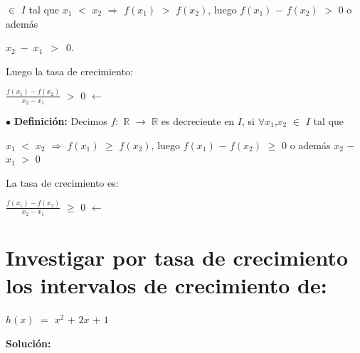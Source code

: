\documentclass[12pt]{article}
\begin{document}
$\in$ $I$ tal que $x_{1}$ $<$ $x_{2}$ $\Longrightarrow$ $f(x_{1})$ $>$ $f(x_{2})$, luego $f(x_{1})$ $-$ $f(x_{2})$ $>$ $0$ o además \vspace{0.2cm}

\mbox{$x_{2}$ $-$ $x_{1}$ $>$ $0$}. \vspace{0.5cm}

Luego la tasa de crecimiento: \vspace{0.5cm}

\hspace{4cm} {\LARGE{$\frac{f(x_{1})-f(x_{2})}{x_{2}-x_{1}}$}} $>$ $0$ \hspace{0.3cm} $\boldsymbol{\longleftarrow}$ {}

\hspace{10cm} {} \vspace{0.5cm}

{\textcolor{Cinnabar}{$\bullet$}} {\bfseries{Definición:}} Decimos $f:$ $\mathbb{R}$ $\rightarrow$ $\mathbb{R}$ es decreciente en $I$, si $\forall x_{1}$,$ x_{2}$ $\in$ $I$ tal que  \vspace{0.2cm}

$x_{1}$ $<$ $x_{2}$ $\Longrightarrow$ $f(x_{1})$ $\geq$ $f(x_{2})$, luego $f(x_{1})$ $-$ $f(x_{2})$ $\geq$ $0$ o además $x_{2}$ $-$ $x_{1}$ $>$ $0$   \vspace{0.5cm}

La tasa de crecimiento es: \vspace{0.5cm}

\hspace{4cm} {\LARGE{$\frac{f(x_{1})-f(x_{2})}{x_{2}-x_{1}}$}} $\geq$ $0$ \hspace{0.3cm} $\boldsymbol{\longleftarrow}$ {}

\hspace{12cm} {} 

\newpage

\section*{\textsf{Investigar por tasa de crecimiento los intervalos de crecimiento de:}}
 
\hspace{4cm} $h(x)$ $=$ $x^{2}$ $+$ $2x$ $+$ $1$ \vspace{0.5cm}

{\textcolor{Cinnabar}{\bfseries{Solución:}}} \vspace{0.5cm}
\end{document}
